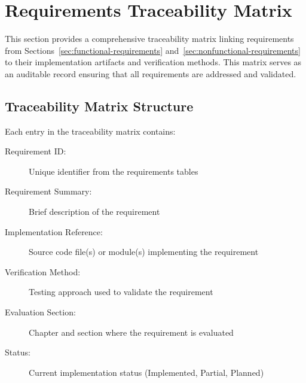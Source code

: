 
\section{Requirements Traceability Matrix}
\label{sec:traceability-matrix}

This section provides a comprehensive traceability matrix linking requirements from Sections~\ref{sec:functional-requirements} and~\ref{sec:nonfunctional-requirements} to their implementation artifacts and verification methods. This matrix serves as an auditable record ensuring that all requirements are addressed and validated.

\subsection{Traceability Matrix Structure}
\label{subsec:traceability-structure}

Each entry in the traceability matrix contains:

\begin{description}
    \item[Requirement ID:] Unique identifier from the requirements tables
    \item[Requirement Summary:] Brief description of the requirement
    \item[Implementation Reference:] Source code file(s) or module(s) implementing the requirement
    \item[Verification Method:] Testing approach used to validate the requirement
    \item[Evaluation Section:] Chapter and section where the requirement is evaluated
    \item[Status:] Current implementation status (Implemented, Partial, Planned)
\end{description}

